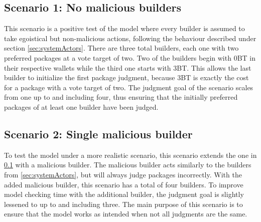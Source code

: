 \documentclass[english, biblatex, digitaloutput]{kththesis}
\begin{document}
\subsection{Scenario 1: No malicious builders}
\label{subsec:scenario_non-malicious}

This scenario is a positive test of the model where every builder is assumed to take egoistical but non-malicious actions, following the behaviour described under section \ref{sec:systemActors}. There are three total builders, each one with two preferred packages at a vote target of two. Two of the builders begin with 0BT in their respective wallets while the third one starts with 3BT. This allows the last builder to initialize the first package judgment, because 3BT is exactly the cost for a package with a vote target of two. The judgment goal of the scenario scales from one up to and including four, thus ensuring that the initially preferred packages of at least one builder have been judged.

\subsection{Scenario 2: Single malicious builder}
\label{subsec:scenario_single_malicious}

To test the model under a more realistic scenario, this scenario extends the one in \ref{subsec:scenario_non-malicious} with a malicious builder. The malicious builder acts similarly to the builders from \ref{sec:systemActors}, but will always judge packages incorrectly. With the added malicious builder, this scenario has a total of four builders. To improve model checking time with the additional builder, the judgment goal is slightly lessened to up to and including three. The main purpose of this scenario is to ensure that the model works as intended when not all judgments are the same.



\end{document}
